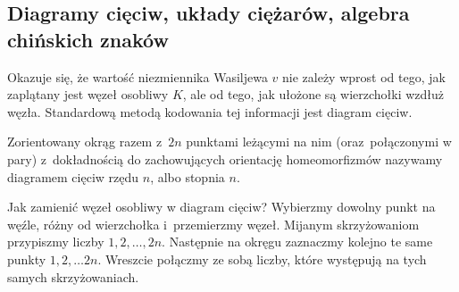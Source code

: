 
\subsection{Diagramy cięciw, układy ciężarów, algebra chińskich znaków}

Okazuje się, że wartość niezmiennika Wasiljewa $v$ nie zależy wprost od tego, jak zaplątany jest węzeł osobliwy $K$, ale od tego, jak ułożone są wierzchołki wzdłuż węzła. Standardową metodą kodowania tej informacji jest diagram cięciw.

\begin{definition}
%
    Zorientowany okrąg razem z~$2n$ punktami leżącymi na nim (oraz~połączonymi w pary) z~dokładnością do zachowujących orientację homeomorfizmów nazywamy diagramem cięciw rzędu $n$, albo stopnia $n$.
\end{definition}

\begin{comment}
\begin{figure}[H]
    \centering
    \begin{minipage}[b]{.18\linewidth}
        \[\LargeChordDiagramA\]
        \subcaption{}
    \end{minipage}
    \begin{minipage}[b]{.18\linewidth}
        \[\LargeChordDiagramB\]
        \subcaption{}
    \end{minipage}
    \begin{minipage}[b]{.18\linewidth}
        \[\LargeChordDiagramC\]
        \subcaption{}
    \end{minipage}
    \begin{minipage}[b]{.18\linewidth}
        \[\LargeChordDiagramD\]
        \subcaption{}
    \end{minipage}
    \begin{minipage}[b]{.18\linewidth}
        \[\LargeChordDiagramE\]
        \subcaption{}
    \end{minipage}
    \caption{Wszystkie pięć diagramów cięciw stopnia 3}
\end{figure}
\end{comment}

Jak zamienić węzeł osobliwy w diagram cięciw?
Wybierzmy dowolny punkt na węźle, różny od wierzchołka i~przemierzmy węzeł.
Mijanym skrzyżowaniom przypiszmy liczby $1, 2, \ldots, 2n$.
Następnie na okręgu zaznaczmy kolejno te same punkty $1, 2, \ldots 2n$.
Wreszcie połączmy ze sobą liczby, które występują na tych samych skrzyżowaniach.

